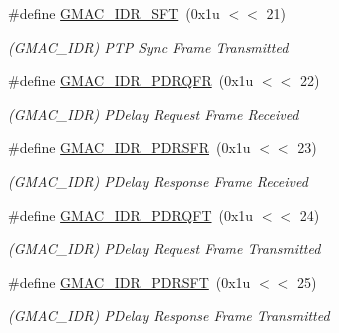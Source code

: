 \begin{DoxyCompactItemize}
\mbox{\label{group__SAME70__GMAC_ga03cc6db018d0446a599c6de8dbc28d24}} 
\#define \mbox{\hyperlink{group__SAME70__GMAC_ga03cc6db018d0446a599c6de8dbc28d24}{G\+M\+A\+C\+\_\+\+I\+D\+R\+\_\+\+S\+FT}}~(0x1u $<$$<$ 21)
\begin{DoxyCompactList}\small\item\em (G\+M\+A\+C\+\_\+\+I\+DR) P\+TP Sync Frame Transmitted \end{DoxyCompactList}\item 
\mbox{\label{group__SAME70__GMAC_ga3c4b887a53ea76463c15db8cdcf9f31d}} 
\#define \mbox{\hyperlink{group__SAME70__GMAC_ga3c4b887a53ea76463c15db8cdcf9f31d}{G\+M\+A\+C\+\_\+\+I\+D\+R\+\_\+\+P\+D\+R\+Q\+FR}}~(0x1u $<$$<$ 22)
\begin{DoxyCompactList}\small\item\em (G\+M\+A\+C\+\_\+\+I\+DR) P\+Delay Request Frame Received \end{DoxyCompactList}\item 
\mbox{\label{group__SAME70__GMAC_gac25c76126576bd0064e3e6384fdaadda}} 
\#define \mbox{\hyperlink{group__SAME70__GMAC_gac25c76126576bd0064e3e6384fdaadda}{G\+M\+A\+C\+\_\+\+I\+D\+R\+\_\+\+P\+D\+R\+S\+FR}}~(0x1u $<$$<$ 23)
\begin{DoxyCompactList}\small\item\em (G\+M\+A\+C\+\_\+\+I\+DR) P\+Delay Response Frame Received \end{DoxyCompactList}\item 
\mbox{\label{group__SAME70__GMAC_gae3eccd1ed2607e943c55ed9655377742}} 
\#define \mbox{\hyperlink{group__SAME70__GMAC_gae3eccd1ed2607e943c55ed9655377742}{G\+M\+A\+C\+\_\+\+I\+D\+R\+\_\+\+P\+D\+R\+Q\+FT}}~(0x1u $<$$<$ 24)
\begin{DoxyCompactList}\small\item\em (G\+M\+A\+C\+\_\+\+I\+DR) P\+Delay Request Frame Transmitted \end{DoxyCompactList}\item 
\mbox{\label{group__SAME70__GMAC_ga1ba746fb0ed0a218e1130f9156d782e0}} 
\#define \mbox{\hyperlink{group__SAME70__GMAC_ga1ba746fb0ed0a218e1130f9156d782e0}{G\+M\+A\+C\+\_\+\+I\+D\+R\+\_\+\+P\+D\+R\+S\+FT}}~(0x1u $<$$<$ 25)
\begin{DoxyCompactList}\small\item\em (G\+M\+A\+C\+\_\+\+I\+DR) P\+Delay Response Frame Transmitted \end{DoxyCompactList}\item 
$$
\end{DoxyCompactItemize}
